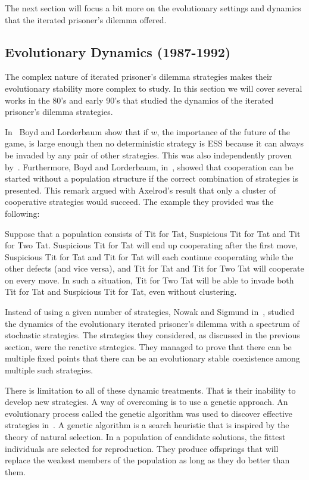 \documentclass{article}
\theoremstyle{definition}
\begin{document}
The next section will focus a bit more on the evolutionary settings and dynamics
that the iterated prisoner's dilemma offered.

\subsection{Evolutionary Dynamics (1987-1992)}\label{section:evolutionary_dynamics}

The complex nature of iterated prisoner's dilemma strategies makes their evolutionary
stability more complex to study. In this section we will cover several works in
the 80's and early 90's that
studied the dynamics of the iterated prisoner's dilemma strategies.

In~\cite{Boyd1987} Boyd and Lorderbaum show that if \(w\), the importance of the
future of the game, is large enough then no deterministic strategy is ESS because
it can always be invaded by any pair of other strategies.
This was also independently proven by~\cite{Pudaite1987}.
Furthermore, Boyd and Lorderbaum, in~\cite{Boyd1989}, showed that cooperation can
be started without a population structure if the correct combination of strategies
is presented. This remark argued with Axelrod's result that only a cluster of
cooperative strategies would succeed. The example they provided was the following:

Suppose that a population consists of Tit for Tat, Suspicious Tit for Tat and
Tit for Two Tat. Suspicious Tit for Tat will end up cooperating after the first
move, Suspicious Tit for Tat and Tit for Tat will each continue cooperating while
the other defects (and vice versa), and Tit for Tat and Tit for Two Tat will cooperate
on every move. In such a situation, Tit for Two Tat will be able to invade both
Tit for Tat and Suspicious Tit for Tat, even without clustering.

Instead of using a given number of strategies, Nowak and Sigmund in~\cite{nowak1989},
studied the dynamics of the evolutionary
iterated prisoner's dilemma with a spectrum of stochastic strategies.
The strategies they considered, as discussed in the previous section, were the reactive
strategies. They managed to prove that there can be multiple fixed points that
there can be an evolutionary stable coexistence among multiple such strategies.

There is limitation to all of these  dynamic treatments. That is their inability
to develop new strategies. A way of overcoming  is to use a genetic approach.
An evolutionary process called the genetic algorithm was used to discover
effective strategies in~\cite{Axelrod1987}. A genetic algorithm is a search heuristic
that is inspired by the theory of natural selection. In a population of candidate
solutions, the fittest individuals are selected for reproduction. They
produce offsprings that will replace the weakest members of the population as long
as they do better than them.
\end{document}
